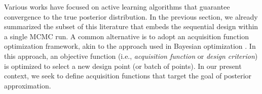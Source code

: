\documentclass[12pt]{article}
\begin{document}
Various works have focused on active learning algorithms that guarantee convergence to the 
true posterior distribution. In the previous section, we already summarized the subset of 
this literature that embeds the sequential design within a single MCMC run. A common 
alternative is to adopt an acquisition function optimization framework, akin to the approach 
used in Bayesian optimization \citep{reviewBayesOpt}. In this approach, an objective 
function (i.e., \textit{acquisition function} or \textit{design criterion}) is optimized to select a new 
design point (or batch of points). In our present context, we seek to define acquisition 
functions that target the goal of posterior approximation. 
 
 







\end{document}
